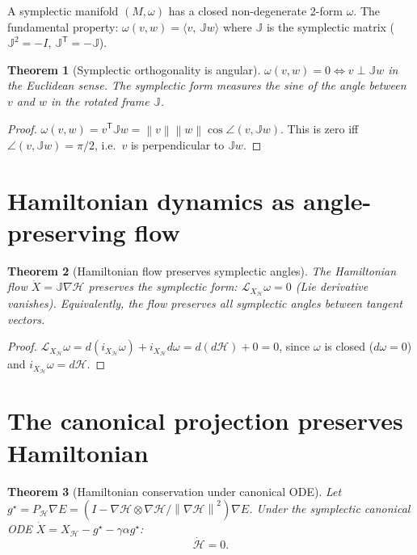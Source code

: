 \documentclass[11pt,a4paper,openany]{book}
\newtheorem{theorem}{Theorem}[chapter]
\theoremstyle{definition}
\newcommand{\T}{^{\mathsf{T}}}
\newcommand{\norm}[1]{\left\|#1\right\|}
\newcommand{\inner}[2]{\langle #1,\,#2\rangle}
\begin{document}
A symplectic manifold $(M, \omega)$ has a closed non-degenerate 2-form $\omega$.
The fundamental property: $\omega(v, w) = \inner{v}{\mathbb{J}w}$ where $\mathbb{J}$ is the
symplectic matrix ($\mathbb{J}^2 = -I$, $\mathbb{J}\T = -\mathbb{J}$).

\begin{theorem}[Symplectic orthogonality is angular]
$\omega(v, w) = 0 \iff v \perp \mathbb{J}w$ in the Euclidean sense.
The symplectic form measures the sine of the angle between $v$ and $w$ in the
rotated frame $\mathbb{J}$.
\end{theorem}

\begin{proof}
$\omega(v, w) = v\T\mathbb{J}w = \norm{v}\norm{w}\cos\angle(v, \mathbb{J}w)$.
This is zero iff $\angle(v, \mathbb{J}w) = \pi/2$, i.e.\ $v$ is perpendicular to $\mathbb{J}w$.
\end{proof}

\section{Hamiltonian dynamics as angle-preserving flow}

\begin{theorem}[Hamiltonian flow preserves symplectic angles]
The Hamiltonian flow $\dot X = \mathbb{J}\nabla\mathcal{H}$ preserves the symplectic form:
$\mathcal{L}_{X_\mathcal{H}}\omega = 0$ (Lie derivative vanishes).
Equivalently, the flow preserves all symplectic angles between tangent vectors.
\end{theorem}

\begin{proof}
$\mathcal{L}_{X_\mathcal{H}}\omega = d(i_{X_\mathcal{H}}\omega) + i_{X_\mathcal{H}}d\omega = d(d\mathcal{H}) + 0 = 0$,
since $\omega$ is closed ($d\omega = 0$) and $i_{X_\mathcal{H}}\omega = d\mathcal{H}$.
\end{proof}

\section{The canonical projection preserves Hamiltonian}

\begin{theorem}[Hamiltonian conservation under canonical ODE]
Let $g^\star = P_\mathcal{H}\nabla E = (I - \nabla\mathcal{H}\otimes\nabla\mathcal{H}/\norm{\nabla\mathcal{H}}^2)\nabla E$.
Under the symplectic canonical ODE $\dot X = X_\mathcal{H} - g^\star - \gamma\alpha g^\star$:
\[
\dot{\mathcal{H}} = 0.
\]
\end{theorem}
\end{document}

